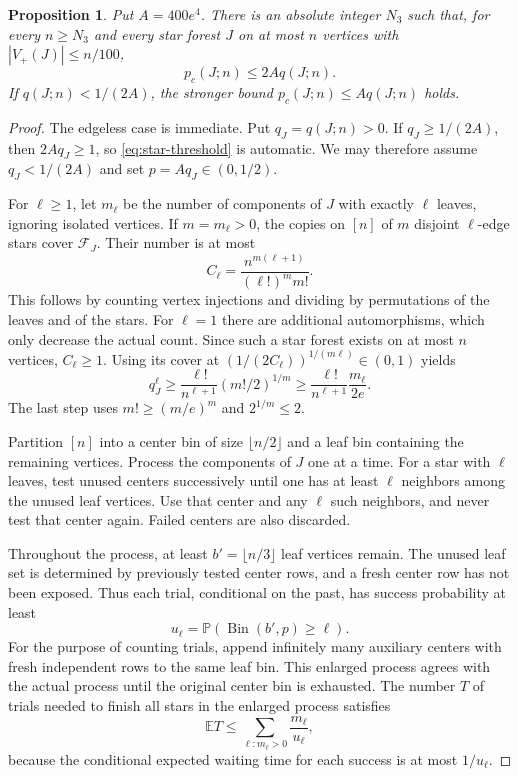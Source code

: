 \documentclass[11pt]{article}
\newtheorem{proposition}[theorem]{Proposition}
\theoremstyle{remark}
\numberwithin{equation}{section}
\newcommand{\E}{\mathbb E}
\newcommand{\Prob}{\mathbb P}
\newcommand{\calF}{\mathcal F}
\DeclareMathOperator{\Bin}{Bin}
\begin{document}
\begin{proposition}\label{prop:stars}
Put $A=400e^4$. There is an absolute integer $N_3$ such that,
for every $n\geq N_3$ and every star forest $J$ on at most $n$
vertices with $|V_+(J)|\leq n/100$,
\begin{equation}\label{eq:star-threshold}
 p_c(J;n)\leq2Aq(J;n).
\end{equation}
If $q(J;n)<1/(2A)$, the stronger bound
$p_c(J;n)\leq Aq(J;n)$ holds.
\end{proposition}
\begin{proof}
The edgeless case is immediate. Put $q_J=q(J;n)>0$.
If $q_J\geq1/(2A)$, then $2Aq_J\geq1$, so
\eqref{eq:star-threshold} is automatic. We may therefore
assume $q_J<1/(2A)$ and set $p=Aq_J\in(0,1/2)$.

For $\ell\geq1$, let $m_\ell$ be the number of components
of $J$ with exactly $\ell$ leaves, ignoring isolated vertices.
If $m=m_\ell>0$, the copies on $[n]$ of $m$ disjoint
$\ell$-edge stars cover $\calF_J$. Their number is at most
\[
 C_\ell=\frac{n^{m(\ell+1)}}{(\ell!)^m m!}.
\]
This follows by counting vertex injections and dividing by
permutations of the leaves and of the stars. For $\ell=1$
there are additional automorphisms, which only decrease the
actual count. Since such a star forest exists on at most $n$
vertices, $C_\ell\geq1$. Using its cover at
$(1/(2C_\ell))^{1/(m\ell)}\in(0,1)$ yields
\begin{equation}\label{eq:star-count}
 q_J^\ell\geq\frac{\ell!}{n^{\ell+1}}(m!/2)^{1/m}
 \geq\frac{\ell!}{n^{\ell+1}}\frac{m_\ell}{2e}.
\end{equation}
The last step uses $m!\geq(m/e)^m$ and $2^{1/m}\leq2$.

Partition $[n]$ into a center bin of size $\lfloor n/2\rfloor$
and a leaf bin containing the remaining vertices. Process the
components of $J$ one at a time. For a star with $\ell$ leaves,
test unused centers successively until one has at least $\ell$
neighbors among the unused leaf vertices. Use that center and
any $\ell$ such neighbors, and never test that center again.
Failed centers are also discarded.

Throughout the process, at least $b'=\lfloor n/3\rfloor$
leaf vertices remain. The unused leaf set is determined by
previously tested center rows, and a fresh center row has not
been exposed. Thus each trial, conditional on the past, has
success probability at least
\begin{equation}\label{eq:star-success}
 u_\ell=\Prob(\Bin(b',p)\geq\ell).
\end{equation}
For the purpose of counting trials, append infinitely many
auxiliary centers with fresh independent rows to the same leaf
bin. This enlarged process agrees with the actual process until
the original center bin is exhausted. The number $T$ of trials
needed to finish all stars in the enlarged process satisfies
\begin{equation}\label{eq:expected-trials}
 \E T\leq\sum_{\ell:m_\ell>0}\frac{m_\ell}{u_\ell},
\end{equation}
because the conditional expected waiting time for each success
is at most $1/u_\ell$.


\end{proof}
\end{document}
